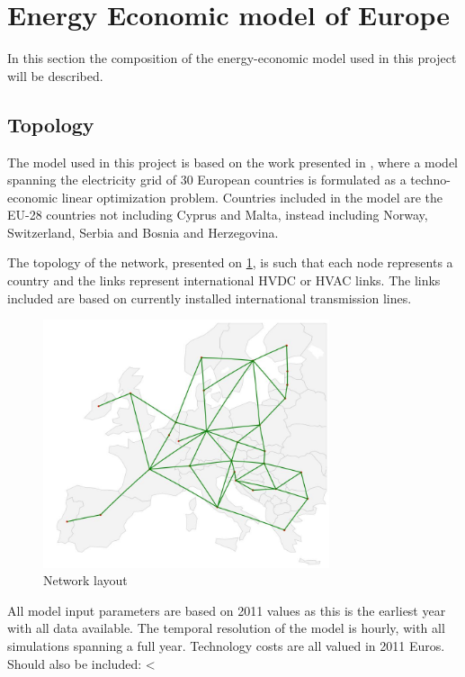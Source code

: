 
\section{Energy Economic model of Europe}
In this section the composition of the energy-economic model used in this project will be described. 

\subsection{Topology}
The model used in  this project is based on the work presented in \cite{PyPSA_euro_30_model}, where a model spanning the electricity grid of 30 European countries is formulated as a techno-economic linear optimization problem. Countries included in the model are the EU-28 countries not including Cyprus and Malta, instead including Norway, Switzerland, Serbia and Bosnia and Herzegovina.

The topology of the network, presented on \ref{fig:network_lay}, is such that each node represents a country and the links represent international HVDC or HVAC links. The links included are based on currently installed international transmission lines. 

	
\begin{figure}[H]\centering
	\includegraphics[width=0.75\textwidth]{./Images/network_layout}
	\caption{Network layout}
	\label{fig:network_lay}
\end{figure}


All model input parameters are based on 2011 values as this is the earliest year with all data available. The temporal resolution of the model is hourly, with all simulations spanning a full year. Technology costs are all valued in 2011 Euros. 
Should also be included:
<
